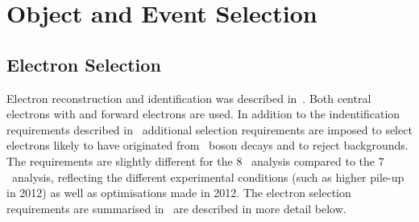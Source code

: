 \graphicspath{{Chapters/ObjEventSelection/Figures/}}
\chapter{Object and Event Selection}
\label{chap:ObjEventSelection}

\section{Electron Selection}

Electron reconstruction and identification was described in~. Both
central electrons with  and forward electrons are used. In
addition to the indentification requirements described in~
additional selection requirements are imposed to select electrons likely to have
originated from \Z\ boson decays and to reject backgrounds. The requirements are
slightly different for the 8 \tev\ analysis compared to the 7 \tev\ analysis,
reflecting the different experimental conditions (such as higher pile-up in
2012) as well as optimisations made in 2012. The electron selection requirements
are summarised in~ are described in more detail below. 

